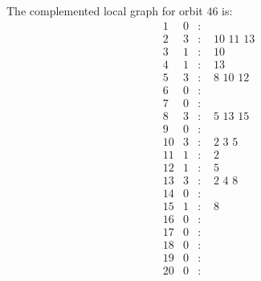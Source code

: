 \documentclass[12pt]{article}
\begin{document}
The complemented local graph for orbit $46$ is:
\begin{equation*}
\begin{array}{rrcl}
1&0&:&\\
2&3&:&\,\,10\,\,11\,\,13\\
3&1&:&\,\,10\\
4&1&:&\,\,13\\
5&3&:&\,\,8\,\,10\,\,12\\
6&0&:&\\
7&0&:&\\
8&3&:&\,\,5\,\,13\,\,15\\
9&0&:&\\
10&3&:&\,\,2\,\,3\,\,5\\
11&1&:&\,\,2\\
12&1&:&\,\,5\\
13&3&:&\,\,2\,\,4\,\,8\\
14&0&:&\\
15&1&:&\,\,8\\
16&0&:&\\
17&0&:&\\
18&0&:&\\
19&0&:&\\
20&0&:&\\
\end{array}
\end{equation*}
\end{document}
